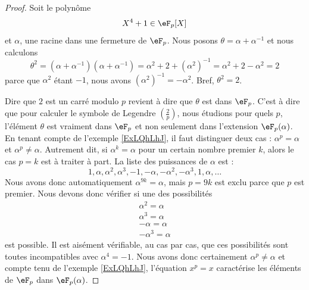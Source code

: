 \begin{proof}
    Soit le polynôme 
    \begin{equation}
        X^4+1\in \eF_p[X]
    \end{equation}
    et \( \alpha\), une racine dans une fermeture de \( \eF_p\). Nous posons \( \theta=\alpha+\alpha^{-1}\) et nous calculons
    \begin{equation}
        \theta^2=(\alpha+\alpha^{-1})(\alpha+\alpha^{-1})=\alpha^2+2+(\alpha^2)^{-1}=\alpha^2+2-\alpha^2=2
    \end{equation}
    parce que \( \alpha^2\) étant \( -1\), nous avons \( (\alpha^2)^{-1}=-\alpha^2\). Bref, \( \theta^2=2\).

    Dire que \( 2\) est un carré modulo \( p\) revient à dire que \( \theta\) est dans \( \eF_p\). C'est à dire que pour calculer le symbole de Legendre \( \left(\frac{2}{p}\right)\), nous étudions pour quels \( p\), l'élément \( \theta\) est vraiment dans \( \eF_p\) et non seulement dans l'extension \( \eF_p(\alpha)\). En tenant compte de l'exemple \ref{ExLQhLhJ}, il faut distinguer deux cas : \( \alpha^p=\alpha\) et \( \alpha^p\neq \alpha\). Autrement dit, si \( \alpha^k=\alpha\) pour un certain nombre premier \( k\), alors le cas \( p=k\) est à traiter à part. La liste des puissances de \( \alpha\) est :
    \begin{equation}
        1,\alpha,\alpha^2,\alpha^3,-1,-\alpha,-\alpha^2,-\alpha^3,1,\alpha,\ldots
    \end{equation}
    Nous avons donc automatiquement \( \alpha^{9k}=\alpha\), mais \( p=9k\) est exclu parce que \( p\) est premier. Nous devons donc vérifier si une des possibilités
    \begin{subequations}
        \begin{align}
            \alpha^2=\alpha\\
            \alpha^3=\alpha\\
            -\alpha=\alpha\\
            -\alpha^3=\alpha
        \end{align}
    \end{subequations}
    est possible. Il est aisément vérifiable, au cas par cas, que ces possibilités sont toutes incompatibles avec \( \alpha^4=-1\). Nous avons donc certainement \( \alpha^p\neq \alpha\) et compte tenu de l'exemple \ref{ExLQhLhJ}, l'équation \( x^p=x\) caractérise les éléments de \( \eF_p\) dans \( \eF_p(\alpha)\).


\end{proof}
